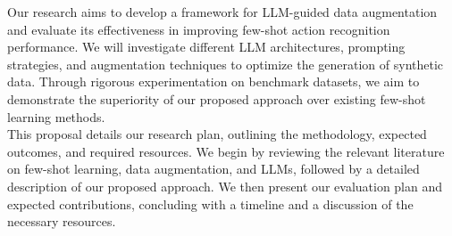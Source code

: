 Our research aims to develop a framework for LLM-guided data augmentation and evaluate its effectiveness in improving few-shot action recognition performance.  We will investigate different LLM architectures, prompting strategies, and augmentation techniques to optimize the generation of synthetic data.  Through rigorous experimentation on benchmark datasets, we aim to demonstrate the superiority of our proposed approach over existing few-shot learning methods.\\

This proposal details our research plan, outlining the methodology, expected outcomes, and required resources. We begin by reviewing the relevant literature on few-shot learning, data augmentation, and LLMs, followed by a detailed description of our proposed approach. We then present our evaluation plan and expected contributions, concluding with a timeline and a discussion of the necessary resources.